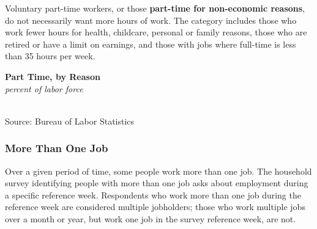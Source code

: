 \documentclass{report}
\makeatletter
\newcommand{\tbllink}[1]{\href{https://raw.githubusercontent.com/bdecon/US-chartbook/master/chartbook/data/#1}{\faTable}}
\newcommand*\short[1]{\expandafter\@gobbletwo\number\numexpr#1\relax}
\newcommand{\absnode}[3]{\node[below right, align=left] at (axis cs: #1,#2) {#3};}
\newcommand{\shdateaxisticks}{
		date coordinates in=x, axis line style={draw=none},
		xmax={2022-10-31},
		max space between ticks=40,	    
		xtick={{1990-01-01}, {1995-01-01}, {2000-01-01}, 
			{2005-01-01}, {2010-01-01}, {2015-01-01}, {2020-01-01}},
		minor xtick={},
		enlarge y limits={0.06}, enlarge x limits={0.01},
		}
\newcommand{\bbar}[2]{extra #1 ticks = {{#2}}, extra #1 tick labels = ,
		extra #1 tick style = {grid=major, grid style={thick, black!25}},}
\newcommand{\stdline}[4]{\addplot[very thick, no markers, color=#1] 
		table [x=#2, y=#3, col sep=comma] {#4};	}
\newcommand{\rebars}{
		\fill[color=black!10] (axis cs:{2007-12-01},\pgfkeysvalueof{/pgfplots/ymin}) rectangle 
			(axis cs:{2009-07-01}, \pgfkeysvalueof{/pgfplots/ymax});
		\fill[color=black!10] (axis cs:{2001-03-01},\pgfkeysvalueof{/pgfplots/ymin}) rectangle 
			(axis cs:{2001-11-01}, \pgfkeysvalueof{/pgfplots/ymax});
		\fill[color=black!10] (axis cs:{2020-02-01},\pgfkeysvalueof{/pgfplots/ymin}) rectangle 
			(axis cs:{2020-05-01}, \pgfkeysvalueof{/pgfplots/ymax});}
\makeatother
\begin{document}
{\begin{minipage}{0.76\textwidth}
Voluntary part-time workers, or those \textbf{part-time for non-economic reasons}, do not necessarily want more hours of work. The category includes those who work fewer hours for health, childcare, personal or family reasons, those who are retired or have a limit on earnings, and those with jobs where full-time is less than 35 hours per week. 
\vspace{0.5mm}

\begin{minipage}{0.56\textwidth}
\normalsize \textbf{Part Time, by Reason}\\
\footnotesize{\textit{percent of labor force}}\\
\hspace*{-2mm} \\
\footnotesize{Source: Bureau of Labor Statistics} \hfill \tbllink{parttime.csv} 
\end{minipage}\hfill
\begin{minipage}{0.38\textwidth}
\small 
\end{minipage}
\vspace{1mm}

\subsubsection*{More Than One Job}
\small Over a given period of time, some people work more than one job. The household survey identifying people with more than one job asks about employment during a specific reference week. Respondents who work more than one job during the reference week are considered multiple jobholders; those who work multiple jobs over a month or year, but work one job in the survey reference week, are not. 
\vspace{0.5mm}


\end{minipage}}
\end{document}
